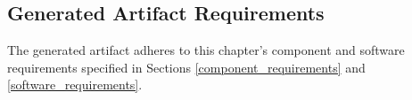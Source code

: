 \subsection{Generated Artifact Requirements} \label{generated_artifact_requirements}

The generated artifact adheres to this chapter's component and software requirements
specified in Sections \ref{component_requirements} and \ref{software_requirements}.
